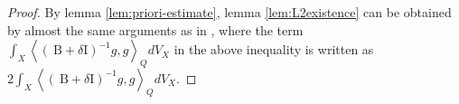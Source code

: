\documentclass[lang=en,12pt,twoside]{textbook}
\begin{document}
\begin{proof}
  By lemma \ref{lem:priori-estimate}, lemma \ref{lem:L2existence} can be obtained by almost the same arguments as in \cite{Demailly2000}, where the term $\int_X\left\langle(\mathrm{~B}+\delta \mathrm{I})^{-1} g, g\right\rangle_Q d V_X$ in the above inequality is written as $2 \int_X\left\langle(\mathrm{~B}+\delta \mathrm{I})^{-1} g, g\right\rangle_Q d V_X$.
\end{proof}



\end{document}
